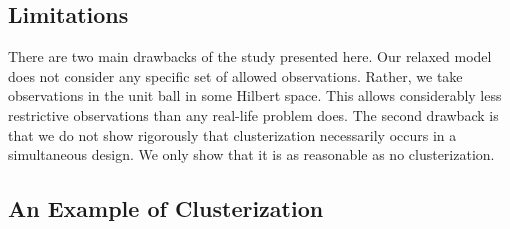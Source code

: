 \documentclass{amsart}
\numberwithin{equation}{section}
\begin{document}
\subsection{Limitations}\label{subsec:limitations}
There are two main drawbacks of the study presented here. Our relaxed
model does not consider any specific set of allowed
observations. Rather, we take observations in the unit ball in some
Hilbert space. This allows considerably less restrictive observations
than any real-life problem does. The second drawback is that we do not
show rigorously that clusterization necessarily occurs in a
simultaneous design. We only show that it is as reasonable as no
clusterization.


\subsection{An Example of Clusterization}\label{subsec:example}
\end{document}
